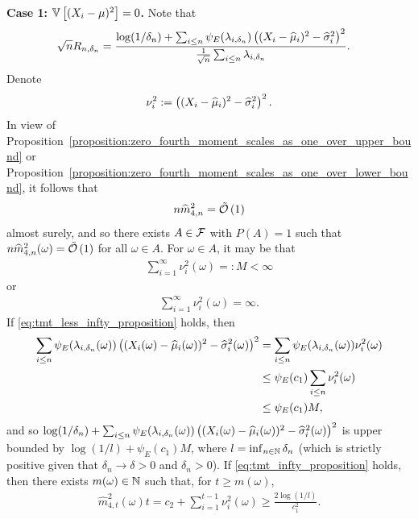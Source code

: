 \textbf{Case 1: $\mathbb{V} \left[ (X_i-\mu)^2\right] = 0$.} Note that 
\begin{align*}
    \sqrt{n} R_{n, \delta_n} &= \frac{\log(1/\delta_n) + \sum_{i \leq n}\psi_E(\lambda_{i, \delta_n}) \left( (X_i - \widehat\mu_i)^2 - \widehat \sigma_i^2 \right)^2}{\frac{1}{\sqrt{n}}\sum_{i \leq n} \lambda_{i, \delta_n}}.
\end{align*}
 Denote %
\begin{align*}
    \nu_i^2 := \left( (X_i - \widehat\mu_i)^2 - \widehat \sigma_i^2 \right)^2.
\end{align*}
In view of Proposition~\ref{proposition:zero_fourth_moment_scales_as_one_over_upper_bound} or Proposition~\ref{proposition:zero_fourth_moment_scales_as_one_over_lower_bound}, it follows that
\begin{align*}
    n\widehat m_{4, n}^2 = \tilde{\mathcal{O}} \left( 1 \right)
\end{align*}
almost surely, and so there exists $A \in \mathcal{F}$ with $P(A) = 1$ such that $n\widehat m_{4, n}^2(\omega) = \tilde{\mathcal{O}} \left( 1 \right)$ for all $\omega \in A$. For $\omega \in A$, it may be that
\begin{align} \label{eq:tmt_less_infty_proposition}
    \sum_{i = 1}^\infty \nu_i^2 (\omega) =: M < \infty
\end{align}
or 
\begin{align} \label{eq:tmt_infty_proposition}
    \sum_{i = 1}^\infty \nu_i^2 (\omega) = \infty.
\end{align}
If \eqref{eq:tmt_less_infty_proposition} holds, then
\begin{align*}
    \sum_{i \leq n}\psi_E(\lambda_{i, \delta_n}(\omega)) \left( (X_i(\omega) - \widehat\mu_i(\omega))^2 - \widehat \sigma_i^2 (\omega)\right)^2 &= \sum_{i \leq n}\psi_E(\lambda_{i, \delta_n}(\omega)) \nu_i^2(\omega)
    \\&\leq \psi_E(c_1)\sum_{i \leq n} \nu_i^2(\omega)
    \\&\leq \psi_E(c_1)M,
\end{align*}
and so $\log(1/\delta_n) + \sum_{i \leq n}\psi_E(\lambda_{i, \delta_n}(\omega)) \left( (X_i(\omega) - \widehat\mu_i(\omega))^2 - \widehat \sigma_i^2(\omega) \right)^2$ is upper bounded by $\log(1/l) + \psi_E(c_1)M$, where $l = \inf_{n \in \mathbb{N}} \delta_n$ (which is strictly positive given that $\delta_n \to \delta > 0$ and $\delta_n >0$). If \eqref{eq:tmt_infty_proposition} holds, then there exists $m(\omega) \in \mathbb{N}$ such that, for $t \geq m(\omega)$, 
    \begin{align*}
        \widehat m_{4, t}^2(\omega) t = c_2 + \sum_{i = 1}^{t-1} \nu_i^2 (\omega) \geq \frac{2\log(1/l)}{c_1^2}.
    \end{align*}
